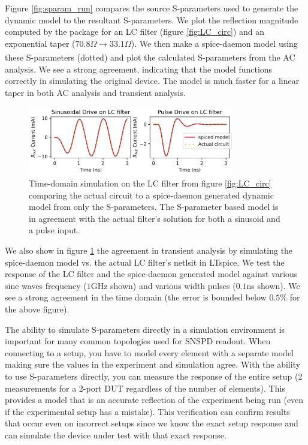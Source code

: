 Figure \ref{fig:sparam_run} compares the source S-parameters used to generate the dynamic
model to the resultant S-parameters. 
We plot the reflection magnitude computed by the  package for an LC
filter (figure \ref{fig:LC_circ}) and an exponential taper ($70.8\Omega \xrightarrow[]{} 33.1\Omega$).
We then make a spice-daemon model using these
S-parameters (dotted) and plot the calculated S-parameters from the AC analysis.
We see a strong agreement, indicating that the model
functions correctly in simulating the original device. The model is much faster for a linear 
taper in both AC analysis and transient analysis.

\begin{figure}
    \centering
    \includegraphics[width=0.8\textwidth]{figs/td_LC.png}
    \caption{Time-domain simulation on the LC filter from figure \ref{fig:LC_circ} comparing the actual circuit to a spice-daemon generated dynamic model from only the S-parameters. The S-parameter based model is in agreement with the actual filter's solution for both a sinusoid
    and a pulse input.}
    \label{fig:td_sparam}
\end{figure}

We also show in figure \ref{fig:td_sparam} the agreement in transient analysis by
simulating the spice-daemon model vs. the actual LC filter's netlsit in LTspice.
We test the response of the LC filter and the spice-daemon generated model against
various sine waves frequency ($1$GHz shown) and various width pulses ($0.1$ns shown).
We see a strong agreement in the time domain (the error is bounded below $0.5\%$ for 
the above figure).

The ability to simulate S-parameters directly in a simulation environment is important
for many common topologies used for SNSPD readout. When connecting to a setup, you have to
model every element with a separate model making sure the values in the experiment and simulation
agree. With the ability to use S-parameters directly, you can measure the response of the entire setup
(2 measurements for a 2-port DUT regardless of the number of elements). 
This provides a model that is an accurate reflection of the experiment being 
run (even if the experimental setup has a mistake). This verification
can confirm results that occur even on incorrect setups since we know the exact setup response
and can simulate the device under test with that exact response. 

